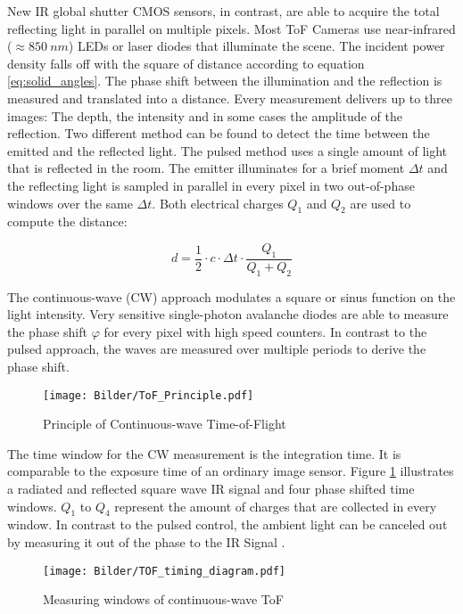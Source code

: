 New IR global shutter CMOS sensors, in contrast, are able to acquire the total reflecting light in parallel on multiple pixels. Most ToF Cameras use near-infrared ($\approx 850~nm$) LEDs or laser diodes that illuminate the scene. The incident power density falls off with the square of distance according to equation \ref{eq:solid_angles}. The phase shift between the illumination and the reflection is measured and translated into a distance. Every measurement delivers up to three images: The depth, the intensity and in some cases the amplitude of the reflection. Two different method can be found to detect the time between the emitted and the reflected light. The pulsed method uses a single amount of light that is reflected in the room. The emitter illuminates for a brief moment $\Delta t$ and the reflecting light is sampled in parallel in every pixel in two out-of-phase windows over the same $\Delta t$. Both electrical charges $Q_1$ and $Q_2$ are used to compute the distance: 

\begin{equation}
d=\frac{1}{2}\cdot c \cdot \Delta t \cdot \frac{Q_1}{Q_1+Q_2}
\end{equation}
\medskip

The continuous-wave (CW) approach modulates a square or sinus function on the light intensity. Very sensitive single-photon avalanche diodes are able to measure the phase shift $\varphi$ for every pixel with high speed counters. In contrast to the pulsed approach, the waves are measured over multiple periods to derive the phase shift.

\begin{figure} [!h]
	\centering
	\texttt{[image: Bilder/ToF\_Principle.pdf]}
	\caption{Principle of Continuous-wave Time-of-Flight \cite{foix2011lock}}
	\label{fig:tof_reflection}
\end{figure} 

The time window for the CW measurement is the integration time. It is comparable to the exposure time of an ordinary image sensor. Figure \ref{fig:tof_reflection} illustrates a radiated and reflected square wave IR signal and four phase shifted time windows. $Q_1$ to $Q_4$ represent the amount of charges that are collected in every window. In contrast to the pulsed control, the ambient light can be canceled out by measuring it out of the phase to the IR Signal \cite{litime}.

\begin{figure} [!h]
	\centering
	\texttt{[image: Bilder/TOF\_timing\_diagram.pdf]}
	\caption{Measuring windows of continuous-wave ToF}
	\label{fig:CW_principle}
\end{figure} 

